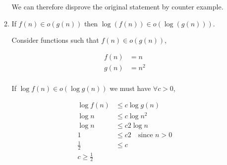 \begin{enumerate}
\begin{enumerate}
                    We can therefore disprove the original statement by counter example. \\

              \item If $f(n) \in o(g(n))$ then $\log(f(n)) \in o(\log(g(n)))$.





                    Consider functions such that $f\left(n\right) \in o\left(g\left(n\right)\right)$,

                    \begin{align*}
                        f\left(n\right) & = n   \\
                        g\left(n\right) & = n^2 \\
                    \end{align*}

                    If $\log{f \left( n \right)} \in o\left( \log{g \left( n \right)} \right)$ we must
                    have $\forall c > 0$,

                    \begin{align*}
                        \log{f \left( n \right)} & \le c \log{g \left( n \right)}     \\
                        \log{n}                  & \le c \log{n^2}                    \\
                        \log{n}                  & \le c 2 \log{n}                    \\
                        1                        & \le c 2 \quad \text{since $n > 0$} \\
                        \frac{1}{2}              & \le c                              \\
                        c \ge \frac{1}{2}
                    \end{align*}


\end{enumerate}
\end{enumerate}
